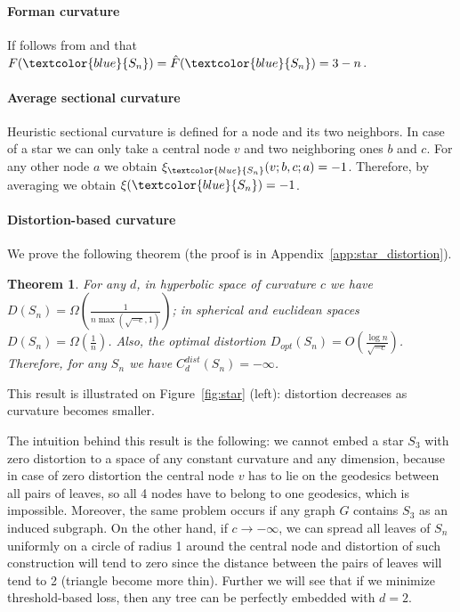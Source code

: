 \documentclass{article} %
\newtheorem{theorem}{Theorem}[section]
\newcommand{\ph}[1]{\textcolor{blue}{#1}}
\begin{document}
\paragraph{Forman curvature}
If follows from  and  that
$F(\ph{S_n}) = \hat F(\ph{S_n}) = 3-n$.


\paragraph{Average sectional curvature}

Heuristic sectional curvature is defined for a node and its two neighbors. In case of a star we can only take a central node $v$ and two neighboring ones $b$ and $c$. For any other node $a$ we obtain $\xi_{\ph{S_n}}(v;b,c;a) = -1$. Therefore, by averaging we obtain $\xi(\ph{S_n}) = -1$.

\paragraph{Distortion-based curvature} 
We prove the following theorem (the proof is in Appendix~\ref{app:star_distortion}).

\begin{theorem}\label{thm:star_distortion}
For any $d$, in hyperbolic space of curvature $c$ we have $D(S_n) = \Omega\left(\frac{1}{n\max(\sqrt{-c},1)}\right)$; in spherical and euclidean spaces $D(S_n) = \Omega\left(\frac{1}{n}\right)$. Also, the optimal distortion $D_{opt}(S_n) = O\left(\frac{\log n}{\sqrt{-c}}\right)$. Therefore, for any $S_n$ we have $C_d^{dist}(S_n) = -\infty$.
\end{theorem}

This result is illustrated on Figure~\ref{fig:star} (left): distortion decreases as curvature becomes smaller.

The intuition behind this result is the following: we cannot embed a star $S_3$ with zero distortion to a space of any constant curvature and any dimension, because in case of zero distortion the central node $v$ has to lie on the geodesics between all pairs of leaves, so all 4 nodes have to belong to one geodesics, which is impossible. Moreover, the same problem occurs if any graph $G$ contains $S_3$ as an induced subgraph.
On the other hand, if $c \to -\infty$, we can spread all leaves of $S_n$ uniformly on a circle of radius 1 around the central node and distortion of such construction will tend to zero since the distance between the pairs of leaves will tend to 2 (triangle become more thin). 
Further we will see that if we minimize threshold-based loss, then any tree can be perfectly embedded with $d = 2$.
\end{document}

